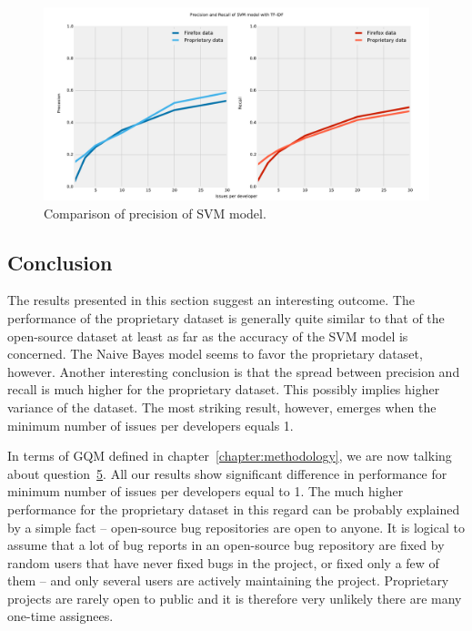 \begin{figure}[htbp]
    \centering
        \includegraphics[width=\textwidth]{./images/prop_vs_os/svm_precision_and_recall.pdf}
    \caption{Comparison of precision of SVM model.}
    \label{fig:results.datasets.svm_pr}
\end{figure}

\subsection{Conclusion}

The results presented in this section suggest an interesting outcome. The performance of the proprietary dataset is generally quite similar to that of the open-source dataset at least as far as the accuracy of the SVM model is concerned. The Naive Bayes model seems to favor the proprietary dataset, however. Another interesting conclusion is that the spread between precision and recall is much higher for the proprietary dataset. This possibly implies higher variance of the dataset. The most striking result, however, emerges when the minimum number of issues per developers equals 1.

In terms of GQM defined in chapter~\ref{chapter:methodology}, we are now talking about question~\hyperlink{question:5}{5}. All our results show significant difference in performance for minimum number of issues per developers equal to 1. The much higher performance for the proprietary dataset in this regard can be probably explained by a simple fact -- open-source bug repositories are open to anyone. It is logical to assume that a lot of bug reports in an open-source bug repository are fixed by random users that have never fixed bugs in the project, or fixed only a few of them -- and only several users are actively maintaining the project. Proprietary projects are rarely open to public and it is therefore very unlikely there are many one-time assignees.

